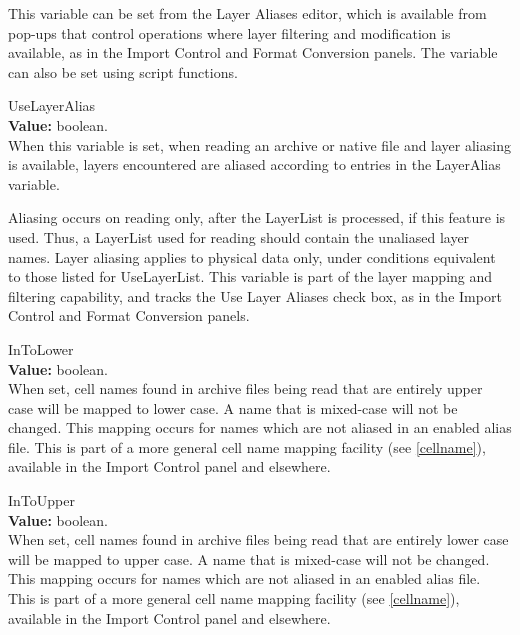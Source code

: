 \begin{description}
This variable can be set from the {\cb Layer Aliases} editor, which is
available from pop-ups that control operations where layer filtering
and modification is available, as in the {\cb Import Control} and {\cb
Format Conversion} panels.  The variable can also be set using script
functions.

\item{\et UseLayerAlias}\\
{\bf Value:} boolean.\\
When this variable is set, when reading an archive or native file and
layer aliasing is available, layers encountered are aliased according
to entries in the {\et LayerAlias} variable.

Aliasing occurs on reading only, after the {\et LayerList} is
processed, if this feature is used.  Thus, a {\et LayerList} used for
reading should contain the unaliased layer names.  Layer aliasing
applies to physical data only, under conditions equivalent to those
listed for {\et UseLayerList}.  This variable is part of the layer
mapping and filtering capability, and tracks the {\cb Use Layer
Aliases} check box, as in the {\cb Import Control} and {\cb
Format Conversion} panels.

\item{\et InToLower}\\
{\bf Value:} boolean.\\
When set, cell names found in archive files being read that are
entirely upper case will be mapped to lower case.  A name that is
mixed-case will not be changed.  This mapping occurs for names which
are not aliased in an enabled alias file.  This is part of a more
general cell name mapping facility (see \ref{cellname}), available in
the {\cb Import Control} panel and elsewhere.

\item{\et InToUpper}\\
{\bf Value:} boolean.\\
When set, cell names found in archive files being read that are
entirely lower case will be mapped to upper case.  A name that is
mixed-case will not be changed.  This mapping occurs for names which
are not aliased in an enabled alias file.  This is part of a more
general cell name mapping facility (see \ref{cellname}), available in
the {\cb Import Control} panel and elsewhere.


\end{description}
